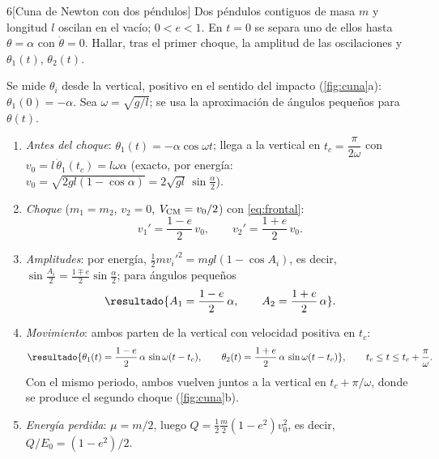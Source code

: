 \begin{problema}{6}[Cuna de Newton con dos péndulos]
\label{prob:6}
Dos péndulos contiguos de masa $m$ y longitud $l$ oscilan en el vacío; $0<e<1$.
En $t=0$ se separa uno de ellos hasta $\theta=\alpha$ con $\dot\theta=0$. Hallar, tras el
primer choque, la amplitud de las oscilaciones y $\theta_{1}(t)$, $\theta_{2}(t)$.
\end{problema}

\begin{resolucion}
Se mide $\theta_{i}$ desde la vertical, positivo en el sentido del impacto
(\cref{fig:cuna}a): $\theta_{1}(0)=-\alpha$. Sea $\omega=\sqrt{g/l}$; se usa la
aproximación de ángulos pequeños para $\theta(t)$.
\begin{enumerate}
  \item \emph{Antes del choque}: $\theta_{1}(t)=-\alpha\cos\omega t$; llega a la vertical en
  $t_{c}=\dfrac{\pi}{2\omega}$ con $v_{0}=l\,\dot\theta_{1}(t_{c})=l\omega\alpha$
  (exacto, por energía: $v_{0}=\sqrt{2gl(1-\cos\alpha)}=2\sqrt{gl}\,\sin\frac\alpha2$).
  \item \emph{Choque} ($m_{1}=m_{2}$, $v_{2}=0$, $V_{\mathrm{CM}}=v_{0}/2$) con \eqref{eq:frontal}:
  \[
    v_{1}'=\frac{1-e}{2}\,v_{0},\qquad v_{2}'=\frac{1+e}{2}\,v_{0} .
  \]
  \item \emph{Amplitudes}: por energía, $\frac12mv_{i}'^{2}=mgl(1-\cos A_{i})$, es decir,
  $\sin\frac{A_{i}}2=\frac{1\mp e}{2}\sin\frac\alpha2$; para ángulos pequeños
  \[
    \resultado{A_{1}=\frac{1-e}{2}\,\alpha,\qquad A_{2}=\frac{1+e}{2}\,\alpha} .
  \]
  \item \emph{Movimiento}: ambos parten de la vertical con velocidad positiva en $t_{c}$:
  \[
    \resultado{\theta_{1}(t)=\frac{1-e}{2}\,\alpha\,\sin\omega(t-t_{c}),\qquad
    \theta_{2}(t)=\frac{1+e}{2}\,\alpha\,\sin\omega(t-t_{c})},
    \qquad t_{c}\le t\le t_{c}+\frac{\pi}{\omega}.
  \]
  Con el mismo periodo, ambos vuelven juntos a la vertical en $t_{c}+\pi/\omega$, donde
  se produce el segundo choque (\cref{fig:cuna}b).
  \item \emph{Energía perdida}: $\mu=m/2$, luego $Q=\frac12\frac m2(1-e^{2})v_{0}^{2}$, es decir,
  $Q/E_{0}=(1-e^{2})/2$.\qedhere
\end{enumerate}
\end{resolucion}


